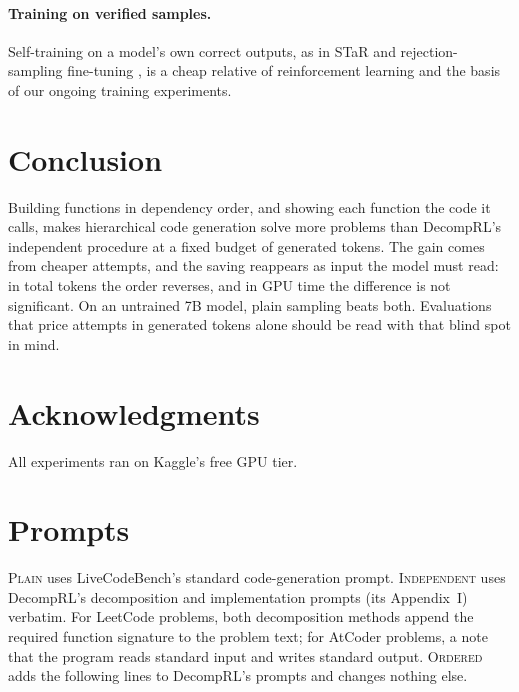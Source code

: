 \documentclass[11pt]{article}
\newcommand{\plain}{\textsc{Plain}}
\newcommand{\indep}{\textsc{Independent}}
\newcommand{\ordered}{\textsc{Ordered}}
\begin{document}
\paragraph{Training on verified samples.} Self-training on a model's own correct outputs, as in STaR
\citep{zelikman2022star} and rejection-sampling fine-tuning \citep{yuan2023rft}, is a cheap relative of reinforcement
learning and the basis of our ongoing training experiments.

\section{Conclusion}

Building functions in dependency order, and showing each function the code it calls, makes hierarchical code
generation solve more problems than DecompRL's independent procedure at a fixed budget of generated tokens. The gain
comes from cheaper attempts, and the saving reappears as input the model must read: in total tokens the order reverses,
and in GPU time the difference is not significant. On an untrained 7B model, plain sampling beats both. Evaluations
that price attempts in generated tokens alone should be read with that blind spot in mind.

\section*{Acknowledgments}
All experiments ran on Kaggle's free GPU tier.




\clearpage
\appendix

\section{Prompts}
\label{app:prompts}

\plain{} uses LiveCodeBench's standard code-generation prompt. \indep{} uses DecompRL's decomposition and implementation
prompts (its Appendix~I) verbatim. For LeetCode problems, both decomposition methods append the required function
signature to the problem text; for AtCoder problems, a note that the program reads standard input and writes standard
output. \ordered{} adds the following lines to DecompRL's prompts and changes nothing else.
\end{document}
